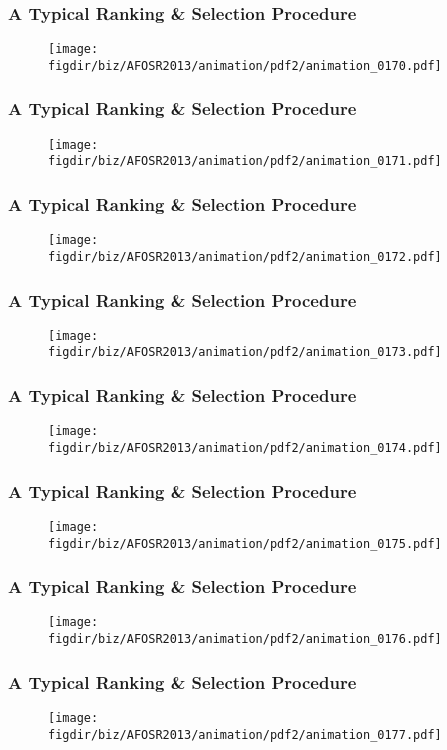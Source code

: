 \documentclass[13pt]{beamer}
\newcommand{\figdir}{../../fig}
\begin{document}
{\begin{frame}\frametitle{A Typical Ranking \& Selection Procedure}\begin{figure}\texttt{[image: \\figdir/biz/AFOSR2013/animation/pdf2/animation\_0170.pdf]}\end{figure}\end{frame}
\begin{frame}\frametitle{A Typical Ranking \& Selection Procedure}\begin{figure}\texttt{[image: \\figdir/biz/AFOSR2013/animation/pdf2/animation\_0171.pdf]}\end{figure}\end{frame}
\begin{frame}\frametitle{A Typical Ranking \& Selection Procedure}\begin{figure}\texttt{[image: \\figdir/biz/AFOSR2013/animation/pdf2/animation\_0172.pdf]}\end{figure}\end{frame}
\begin{frame}\frametitle{A Typical Ranking \& Selection Procedure}\begin{figure}\texttt{[image: \\figdir/biz/AFOSR2013/animation/pdf2/animation\_0173.pdf]}\end{figure}\end{frame}
\begin{frame}\frametitle{A Typical Ranking \& Selection Procedure}\begin{figure}\texttt{[image: \\figdir/biz/AFOSR2013/animation/pdf2/animation\_0174.pdf]}\end{figure}\end{frame}
\begin{frame}\frametitle{A Typical Ranking \& Selection Procedure}\begin{figure}\texttt{[image: \\figdir/biz/AFOSR2013/animation/pdf2/animation\_0175.pdf]}\end{figure}\end{frame}
\begin{frame}\frametitle{A Typical Ranking \& Selection Procedure}\begin{figure}\texttt{[image: \\figdir/biz/AFOSR2013/animation/pdf2/animation\_0176.pdf]}\end{figure}\end{frame}
\begin{frame}\frametitle{A Typical Ranking \& Selection Procedure}\begin{figure}\texttt{[image: \\figdir/biz/AFOSR2013/animation/pdf2/animation\_0177.pdf]}\end{figure}\end{frame}
}
\end{document}
